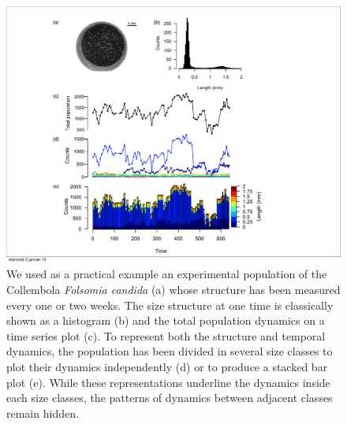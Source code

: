 \begin{figure}[!ht] %
\centering
\includegraphics[height=0.75\textheight]{2_Methodo/Fig/01}
\caption[Classical representation of a population
structure]{We used as a practical example an experimental population of the
Collembola \textit{Folsomia candida} (a) whose structure has been measured every
one or two weeks. The size structure at one time is classically shown as a histogram
(b) and the total population dynamics on a time series plot (c). To represent
both the structure and temporal dynamics, the population has been divided in
several size classes to plot their dynamics independently (d) or to produce a
stacked bar plot (e). While these representations underline the dynamics inside
each size classes, the patterns of dynamics between adjacent classes remain
hidden.
}
\label{fig:ASTd1}
\end{figure}


